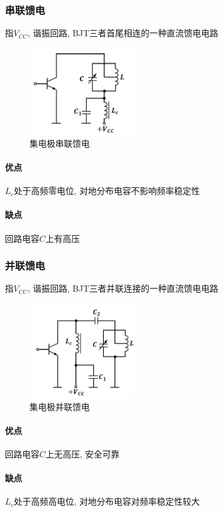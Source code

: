 \documentclass[a4paper]{report}
\begin{document}
\subsubsection{串联馈电}
指$V_{CC}$, 谐振回路, BJT三者首尾相连的一种直流馈电电路
\begin{figure}[H]
\centering
\includegraphics[width=0.4\textwidth]{power_res_fb_c_s.png}
\caption{集电极串联馈电}
\end{figure}

\paragraph{优点} $L_c$处于高频零电位, 对地分布电容不影响频率稳定性
\paragraph{缺点} 回路电容$C$上有高压
\subsubsection{并联馈电}
指$V_{CC}$, 谐振回路, BJT三者并联连接的一种直流馈电电路
\begin{figure}[H]
  \centering
  \includegraphics[width=0.4\textwidth]{power_res_fb_c_p.png}
  \caption{集电极并联馈电}
  \end{figure}
  \paragraph{优点} 回路电容$C$上无高压, 安全可靠
  \paragraph{缺点} $L_c$处于高频高电位, 对地分布电容对频率稳定性较大
\end{document}
